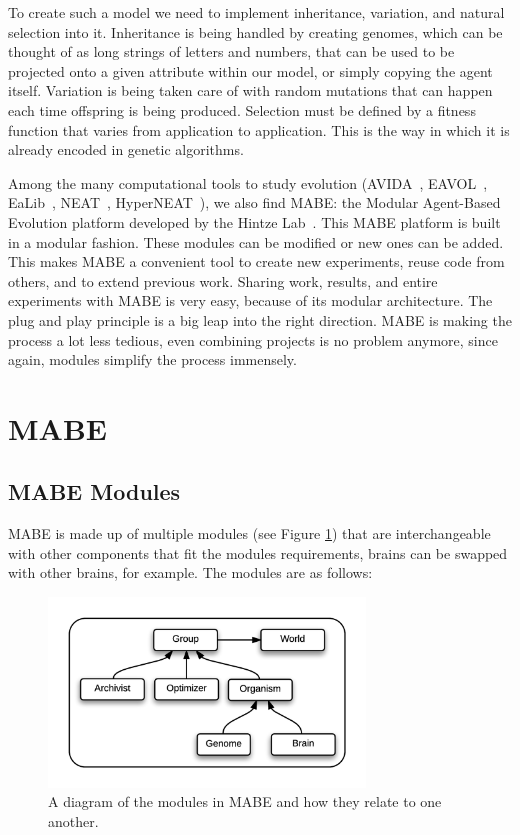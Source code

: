 \documentclass[12pt,oneside,listof=totoc,paper=a4,headings=small]{scrbook}
\begin{document}
To create such a model we need to implement inheritance, variation, and natural selection into it. Inheritance is being handled by creating genomes, which can be thought of as long strings of letters and numbers, that can be used to be projected onto a given attribute within our model, or simply copying the agent itself. Variation is being taken care of with random mutations that can happen each time offspring is being produced. Selection must be defined by a fitness function that varies from application to application. This is the way in which it is already encoded in  genetic algorithms.

Among the many computational tools to study evolution (AVIDA~\cite{adami1994evolutionary}, EAVOL~\cite{knibbe2007long}, EaLib~\cite{dknoester2016ealib}, NEAT~\cite{stanley2002evolving}, HyperNEAT~\cite{gauci2007generating}), %
we also find MABE: the Modular Agent-Based Evolution platform developed by the Hintze Lab~\cite{MABE2016,bohm2017mabe}. This MABE platform is built in a modular fashion. These modules can be modified or new ones can be added. This makes MABE a convenient tool to create new experiments, reuse code from others, and to extend previous work. 
Sharing work, results, and entire experiments with MABE is very easy, because of its modular architecture. The plug and play principle is a big leap into the right direction. MABE is making the process a lot less tedious, even combining projects is no problem anymore, since again, modules simplify the process immensely.


\newpage
\section{MABE}
\subsection{MABE Modules}
MABE is made up of multiple modules (see Figure \ref{fig:MABE_Modules}) that are interchangeable with other components that fit the modules requirements, brains can be swapped with other brains, for example. The modules are as follows: 
\begin{figure}[h!]
\centering
\includegraphics[width=0.75\textwidth,height=0.75\textheight,keepaspectratio]{images/MABE_Overview.png}
\caption{A diagram of the modules in MABE and how they relate to one another.~\cite{mabeModuleChart}}
\label{fig:MABE_Modules}
\end{figure}
\end{document}

